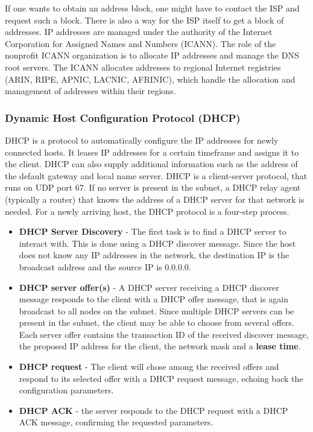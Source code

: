 If one wants to obtain an address block, one might have to contact the ISP and request such a block. There is also a way for the ISP itself to get a block of addresses. IP addresses are managed under the authority of the Internet Corporation for Assigned Names and Numbers (ICANN). The role of the nonprofit ICANN organization is to allocate IP addresses and manage the DNS root servers. The ICANN allocates addresses to regional Internet registries (ARIN, RIPE, APNIC, LACNIC, AFRINIC), which handle the allocation and management of addresses within their regions.

\subsubsection{Dynamic Host Configuration Protocol (DHCP)}
DHCP is a protocol to automatically configure the IP addresses for newly connected hosts. It leases IP addresses for a certain timeframe and assigns it to the client. DHCP can also supply additional information such as the address of the default gateway and local name server. DHCP is a client-server protocol, that runs on UDP port 67. If no server is present in the subnet, a DHCP relay agent (typically a router) that knows the address of a DHCP server for that network is needed. For a newly arriving host, the DHCP protocol is a four-step process.
\begin{itemize}
\item \textbf{DHCP Server Discovery} - The first task is to find a DHCP server to interact with. This is done using a DHCP discover message. Since the host does not know any IP addresses in the network, the destination IP is the broadcast address and the source IP is 0.0.0.0. 
\item \textbf{DHCP server offer(s)} - A DHCP server receiving a DHCP discover message responds to the client with a DHCP offer message, that is again broadcast to all nodes on the subnet. Since multiple DHCP servers can be present in the subnet, the client may be able to choose from several offers. Each server offer contains the transaction ID of the received discover message, the proposed IP address for the client, the network mask and a \textbf{lease time}.
\item \textbf{DHCP request} - The client will chose among the received offers and respond to its selected offer with a DHCP request message, echoing back the configuration parameters.
\item \textbf{DHCP ACK} - the server responds to the DHCP request with a DHCP ACK message, confirming the requested parameters.
\end{itemize}

